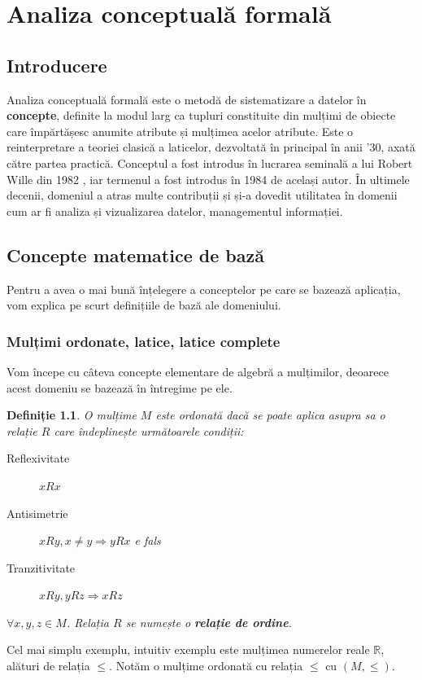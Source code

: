 \documentclass[12pt, a4paper, twoside, romanian]{teza-upb}
\newtheorem{defn}{Definiție}
\begin{document}
\chapter{Analiza conceptuală formală}
\label{chapter:1}
  \section{Introducere}
    Analiza conceptuală formală este o metodă de sistematizare a datelor în \textbf{concepte}, definite la modul larg ca tupluri constituite din mulțimi de obiecte care împărtășesc anumite atribute și mulțimea acelor atribute. Este o reinterpretare a teoriei clasică a laticelor, dezvoltată în principal în anii '30, axată către partea practică. Conceptul a fost introdus în lucrarea seminală a lui Robert Wille din 1982 \cite{wille:1982}, iar termenul a fost introdus în 1984 de același autor. În ultimele decenii, domeniul a atras multe contribuții și și-a dovedit utilitatea în domenii cum ar fi analiza și vizualizarea datelor, managementul informației.
  \section{Concepte matematice de bază}
    Pentru a avea o mai bună înțelegere a conceptelor pe care se bazează aplicația, vom explica pe scurt definițiile de bază ale domeniului.
    \subsection{Mulțimi ordonate, latice, latice complete}
    Vom începe cu câteva concepte elementare de algebră a mulțimilor, deoarece acest domeniu se bazează în întregime pe ele.
    \begin{defn}
      O mulțime $M$ este ordonată dacă se poate aplica asupra sa o relație $R$ care îndeplinește următoarele condiții:
      \begin{description}
        \item [Reflexivitate] $xRx$
        \item [Antisimetrie] $xRy, x \neq y \Rightarrow yRx$ e fals
        \item [Tranzitivitate] $xRy, yRz \Rightarrow xRz$
      \end{description}
      $\forall x, y,z \in M$. Relația $R$ se numește o \textbf{relație de ordine}.
    \end{defn}

    Cel mai simplu exemplu, intuitiv exemplu este mulțimea numerelor reale $ \mathbb{R}$, alături de relația $\le$. Notăm o mulțime ordonată cu relația $\le$ cu $(M, \le)$.
\end{document}

